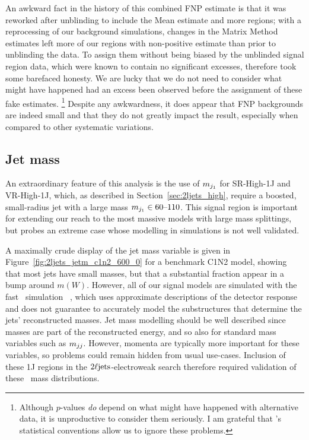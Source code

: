 An awkward fact in the history of this combined FNP estimate is that it
was reworked after unblinding to include the Mean estimate and more regions;
with a reprocessing of our background simulations, changes in the Matrix Method
estimates left more of our regions with non-positive estimate than prior to
unblinding the data.
To assign them without being biased by the unblinded signal region data,
which were known to contain no significant excesses, therefore took some
barefaced honesty.
We are lucky that we do not need to consider what might have happened had an
excess been observed before the assignment of these fake estimates.%
\footnote{%
Although $p$-values \emph{do} depend on what might have happened with
alternative data, it is unproductive to consider them seriously.
I am grateful that \atlas's statistical conventions allow us to ignore these
problems.
}
Despite any awkwardness, it does appear that FNP backgrounds are indeed
small and that they do not greatly impact the result, especially when compared
to other systematic variations.


\subsection{Jet mass}
\label{sec:2ljets_jet_mass}
An extraordinary feature of this analysis is the use of $m_{j_1}$ for
SR-High-1J and VR-High-1J, which, as described in Section~\ref{sec:2ljets_high},
require a boosted, small-radius jet with a large mass
$m_{j_1} \in 60\textrm{--}110$.
This signal region is important for extending our reach to the most massive
models with large mass splittings, but probes an extreme case whose modelling
in simulations is not well validated.

A maximally crude display of the jet mass variable is given in
Figure~\ref{fig:2ljets_jetm_c1n2_600_0} for a benchmark C1N2 model, showing
that most  jets have small masses, but that a substantial fraction appear in a
bump around $m(W)$.
However, all of our signal models are simulated with the fast \atlas\ simulation
\afii\ \cite{SOFT-2010-01}, which uses approximate descriptions of the
detector response and does not guarantee to accurately model the substructures
that determine the jets' reconstructed masses.
Jet mass modelling should be well described since masses are part of the
reconstructed energy, and so also for standard mass variables such as $m_{jj}$.
However, momenta are typically more important for these variables, so
problems could remain hidden from usual use-cases.
Inclusion of these 1J regions in the $2\ell\mathrm{jets}$-electroweak search therefore
required validation of these \afii\ mass distributions.

